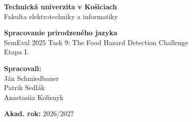 \documentclass[10pt,a4paper]{article}
\begin{document}
\begin{titlepage}
    \centering

    {\Large \textbf{Technická univerzita v Košiciach}}\\[0.4em]
    {\large Fakulta elektrotechniky a informatiky}\\

    \vfill

    {\Large \textbf{Spracovanie prirodzeného jazyka}}\\[0.4em]
    {\large SemEval 2025 Task 9: The Food Hazard Detection Challenge \\[0.6em] Etapa I.}\\

    \vfill

    \begin{minipage}[t]{0.5\textwidth}
        \raggedright
        \textbf{Spracovali:}\\
        Ján Schmiedbauer\\
        Patrik Sedlák\\
        Anastasiia Kolisnyk
    \end{minipage}%
    \begin{minipage}[t]{0.5\textwidth}
        \raggedleft
        \textbf{Akad. rok:} 2026/2027
    \end{minipage}

\end{titlepage}

\setcounter{page}{1}
\thispagestyle{empty}
\tableofcontents
\newpage

\pagestyle{fancy}
\fancyfoot[C]{\thepage}








\end{document}
